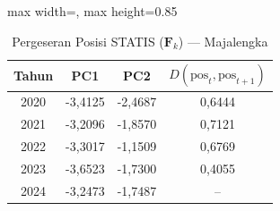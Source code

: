 \begin{table}[H]
\centering
\caption{Pergeseran Posisi STATIS ($\mathbf{F}_k$) --- Majalengka} \label{tab:app2jarak_statis_skor_majalengka}
\begin{adjustbox}{max width=\textwidth, max height=0.85\textheight}
\begin{tabular}{|c|c|c|c|}
\hline
\textbf{Tahun} & \textbf{PC1} & \textbf{PC2} & \textbf{$D(\text{pos}_t, \text{pos}_{t+1})$} \\
\hline
2020 & -3,4125 & -2,4687 & 0,6444 \\
2021 & -3,2096 & -1,8570 & 0,7121 \\
2022 & -3,3017 & -1,1509 & 0,6769 \\
2023 & -3,6523 & -1,7300 & 0,4055 \\
2024 & -3,2473 & -1,7487 & -- \\
\hline
\end{tabular}
\end{adjustbox}
\end{table}